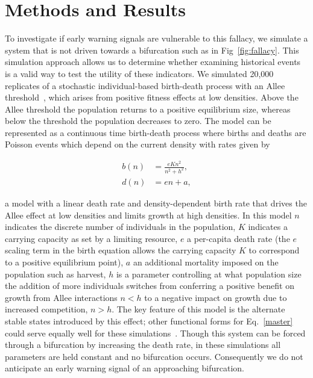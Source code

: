 \documentclass[authoryear,review,12pt]{elsarticle}
\begin{document}
\section{Methods and Results}
To investigate if early warning signals are vulnerable to this fallacy,
we simulate a system that is not driven towards a bifurcation such as
in Fig~\ref{fig:fallacy}.  This simulation approach allows us to determine whether
examining historical events is a valid way to test the utility of these
indicators.  We simulated 20,000 replicates of a stochastic individual-based
birth-death process with an Allee threshold~\citep{Courchamp2008}, which
arises from positive fitness effects at low densities.  Above the Allee
threshold the population returns to a positive equilibrium size, whereas
below the threshold the population decreases to zero. The model can be represented as a continuous time birth-death process where births and deaths are Poisson events which depend on the current density with rates given by

\begin{align}
    b(n) &= \frac{e K n^2}{n^2 + h^2}, \label{master} \\
    d(n) &= e n + a, 
\end{align}




a model with a linear death rate and density-dependent birth
rate that drives the Allee effect at low densities and limits
growth at high densities.  In this model $n$ indicates the discrete
number of individuals in the population, $K$ indicates a carrying 
capacity as set by a limiting resource, $e$ a per-capita death rate (the $e$ scaling term in the birth equation allows the carrying capacity $K$ to correspond to a positive equilibrium point), 
$a$ an additional mortality imposed on the population such as harvest,
$h$ is a parameter controlling at what population size the addition of 
more individuals switches from conferring a positive benefit on growth 
from Allee interactions $n < h$ to a negative impact on growth due to 
increased competition, $n > h$.  The key feature of this model is the
alternate stable states introduced by this effect; other functional
forms for Eq.~\eqref{master} could serve equally well for these
simulations~\citep[see \emph{e.g.}][]{Scheffer2001}.  Though this
system can be forced through a bifurcation by increasing
the death rate, in these simulations all parameters are held constant
and no bifurcation occurs.  Consequently we do not anticipate an early
warning signal of an approaching bifurcation.  
\end{document}
